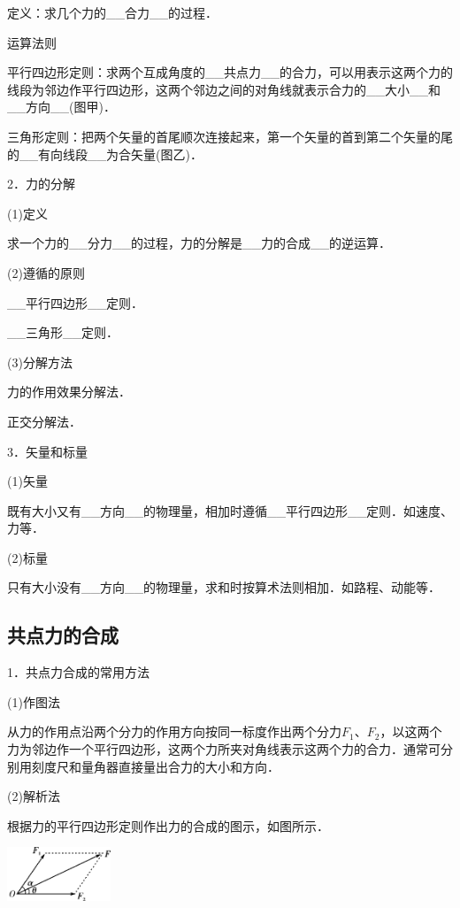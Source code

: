 \documentclass[cn,10.5pt,chinese,mac,chinesefont=founder]{elegantbook}
\begin{document}
定义：求几个力的\_\_合力\_\_的过程．

运算法则

平行四边形定则：求两个互成角度的\_\_共点力\_\_的合力，可以用表示这两个力的线段为邻边作平行四边形，这两个邻边之间的对角线就表示合力的\_\_大小\_\_和\_\_方向\_\_(图甲)．

三角形定则：把两个矢量的首尾顺次连接起来，第一个矢量的首到第二个矢量的尾的\_\_有向线段\_\_为合矢量(图乙)．

2．力的分解

(1)定义

求一个力的\_\_分力\_\_的过程，力的分解是\_\_力的合成\_\_的逆运算．

(2)遵循的原则

\_\_平行四边形\_\_定则．

\_\_三角形\_\_定则．

(3)分解方法

力的作用效果分解法．

正交分解法．

3．矢量和标量

(1)矢量

既有大小又有\_\_方向\_\_的物理量，相加时遵循\_\_平行四边形\_\_定则．如速度、力等．

(2)标量

只有大小没有\_\_方向\_\_的物理量，求和时按算术法则相加．如路程、动能等．
\newpage
\subsection{共点力的合成}

1．共点力合成的常用方法

(1)作图法

从力的作用点沿两个分力的作用方向按同一标度作出两个分力$F_1$、$F_2$，以这两个力为邻边作一个平行四边形，这两个力所夹对角线表示这两个力的合力．通常可分别用刻度尺和量角器直接量出合力的大小和方向．

(2)解析法

根据力的平行四边形定则作出力的合成的图示，如图所示．

\begin{center}\includegraphics[width=1.21875in,height=0.63542in]{media/image64.png}\end{center}
\end{document}
